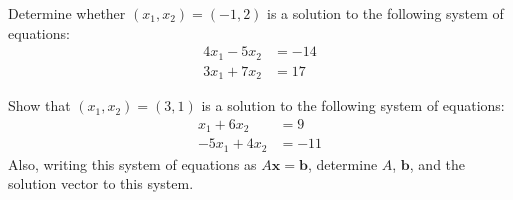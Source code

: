 \documentclass[11pt,letterpaper]{article}
\begin{document}

 Determine whether $(x_1, x_2)= (-1, 2)$ is a solution to the following system of equations:
	\[
	\begin{aligned}
	4x_1 - 5x_2&= -14 \\[0.3cm]
	3x_1 + 7x_2&= 17
	\end{aligned}
	\]



\newpage



 Show that $(x_1, x_2)= (3, 1)$ is a solution to the following system of equations:
	\[
	\begin{aligned}
	x_1 + 6x_2&= 9 \\[0.3cm]
	-5x_1 + 4x_2&= -11
	\end{aligned}
	\]
Also, writing this system of equations as $A\mathbf{x}= \mathbf{b}$, determine $A$, $\mathbf{b}$, and the solution vector to this system. 
\end{document}
